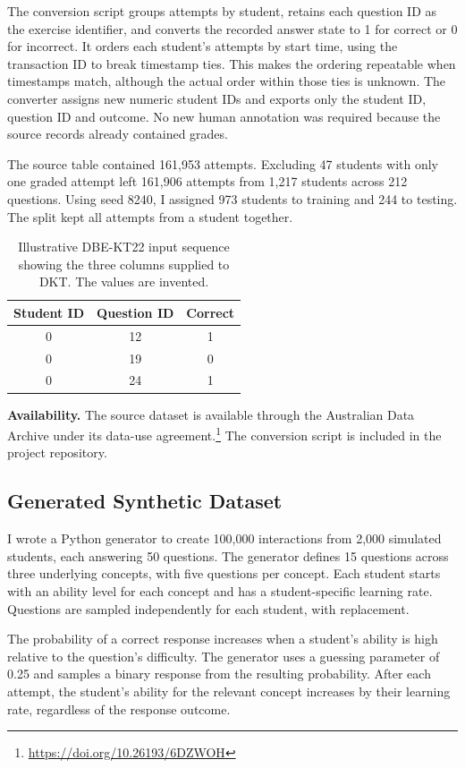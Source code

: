 \documentclass[11pt]{article}
\begin{document}
The conversion script groups attempts by student, retains each
question ID as the exercise identifier, and converts the recorded
answer state to 1 for correct or 0 for incorrect. It orders each
student's attempts by start time, using the transaction ID to break
timestamp ties. This makes the ordering repeatable when timestamps
match, although the actual order within those ties is unknown. The
converter assigns new numeric student IDs and exports only the
student ID, question ID and outcome. No new human annotation was
required because the source records already contained grades.

The source table contained 161,953 attempts. Excluding 47 students
with only one graded attempt left 161,906 attempts from 1,217
students across 212 questions. Using seed 8240, I assigned 973
students to training and 244 to testing. The split kept all attempts
from a student together.

\begin{table}[H]
\centering
\small
\begin{tabular}{@{}ccc@{}}
\hline
Student ID & Question ID & Correct \\
\hline
0 & 12 & 1 \\
0 & 19 & 0 \\
0 & 24 & 1 \\
\hline
\end{tabular}
\caption{Illustrative DBE-KT22 input sequence showing the three
columns supplied to DKT. The values are invented.}
\label{tab:dbekt22-input}
\end{table}

\textbf{Availability.} The source dataset is available through the
Australian Data Archive under its data-use
agreement.\footnote{\url{https://doi.org/10.26193/6DZWOH}}
The conversion script is included in the project repository.

\subsection{Generated Synthetic Dataset}

I wrote a Python generator to create 100,000 interactions from
2,000 simulated students, each answering 50 questions. The generator
defines 15 questions across three underlying concepts, with five
questions per concept. Each student starts with an ability level for
each concept and has a student-specific learning rate. Questions are
sampled independently for each student, with replacement.

The probability of a correct response increases when a student's
ability is high relative to the question's difficulty. The generator
uses a guessing parameter of 0.25 and samples a binary response
from the resulting probability. After each attempt, the student's
ability for the relevant concept increases by their learning rate,
regardless of the response outcome.
\end{document}
